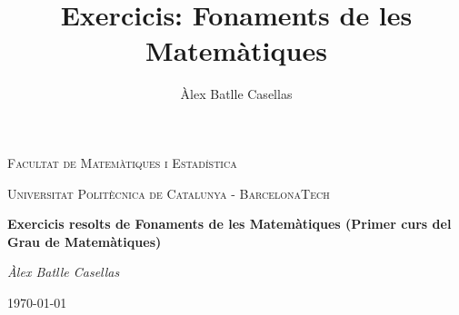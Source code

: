 \documentclass[11pt]{article}
\title{Exercicis: Fonaments de les Matemàtiques}
\author{Àlex Batlle Casellas}
\begin{document}
\begin{titlepage}
	\centering
	{\scshape\LARGE Facultat de Matemàtiques i Estadística \par}
	\vspace{1cm}
	{\scshape\Large Universitat Politècnica de Catalunya - BarcelonaTech\par}
	\vspace{1.5cm}
	{\huge\bfseries Exercicis resolts de Fonaments de les Matemàtiques (Primer curs del Grau de Matemàtiques)
	\par}
	\vspace{2cm}
	{\Large\itshape Àlex Batlle Casellas\par}

	\vfill

	{\large \today\par}
\end{titlepage}


\vfill
\newpage

\tableofcontents
\newpage
\section{}
\end{document}
